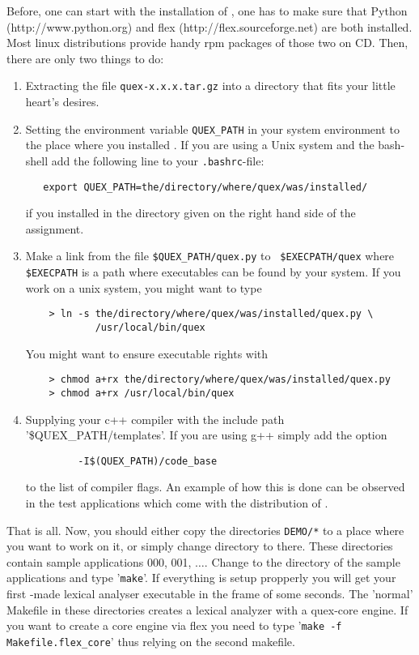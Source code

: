 Before, one can start with the installation of {\quex}, one has to make sure
that Python (http://www.python.org) and flex (http://flex.sourceforge.net) are
both installed. Most linux distributions provide handy rpm packages of those
two on CD. Then, there are only two things to do:

\begin{enumerate}
  \item Extracting the file {\tt quex-x.x.x.tar.gz} into a directory
    that fits your little heart's desires.

  \item Setting the environment variable {\tt QUEX\_PATH} in your system
    environment to the place where you installed {\quex}. If you are using
    a Unix system and the bash-shell add the following line to your
    {\tt .bashrc}-file:
\begin{verbatim}
   export QUEX_PATH=the/directory/where/quex/was/installed/
\end{verbatim}
    if you installed {\quex} in the directory given on the right hand side of
    the assignment.
    
  \item Make a link from the file {\tt \$QUEX\_PATH/quex.py} to {\tt
      \$EXECPATH/quex} where {\tt \$EXECPATH} is a path where executables can
    be found by your system.  If you work on a unix system, you might want to
    type
\begin{verbatim}    
    > ln -s the/directory/where/quex/was/installed/quex.py \
            /usr/local/bin/quex
\end{verbatim}     
     You might want to ensure executable rights with
\begin{verbatim}    
    > chmod a+rx the/directory/where/quex/was/installed/quex.py
    > chmod a+rx /usr/local/bin/quex
\end{verbatim}     

  \item Supplying your c++ compiler with the include path
  '\$QUEX\_PATH/templates'. If you are using g++ simply add the 
  option
  \begin{verbatim}
         -I$(QUEX_PATH)/code_base 
  \end{verbatim}
  to the list of compiler flags. An example of how this is done can 
  be observed in the test applications which come with the
  distribution of {\quex}.
\end{enumerate}

That is all. Now, you should either copy the directories {\tt DEMO/*} to a
place where you want to work on it, or simply change directory to there.  These
directories contain sample applications 000, 001, $\ldots$. Change to the directory of the
sample applications and type '{\tt make}'. If everything is setup propperly
you will get your first {\quex}-made lexical analyser executable in the frame
of some seconds. The 'normal' Makefile in these directories creates a lexical analyzer
with a quex-core engine. If you want to create a core engine via flex you
need to type '{\tt make -f Makefile.flex\_core}' thus relying on the second makefile.


